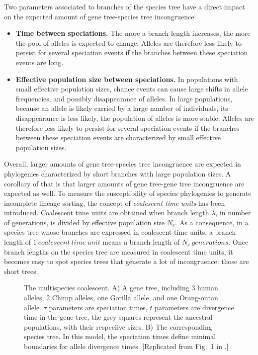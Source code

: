 Two parameters associated to branches of the species tree have a direct impact on the expected amount of gene tree-species tree incongruence:
\begin{itemize}
\item \textbf{Time between speciations.} The more a branch length increases, the more the pool of alleles is expected to change.
Alleles are therefore less likely to persist for several speciation events if the branches between these speciation events are long.
\item \textbf{Effective population size between speciations.} In populations with small effective population sizes, chance events can cause large shifts in allele frequencies, and possibly disappearance of alleles. 
In large populations, because an allele is likely carried by a large number of individuals, its disappearance is less likely, the population of alleles is more stable.
Alleles are therefore less likely to persist for several speciation events if the branches between these speciation events are characterized by small effective population sizes.
\end{itemize}
Overall, larger amounts of gene tree-species tree incongruence are expected in phylogenies characterized by short branches with large population sizes. 
A corollary of that is that larger amounts of gene tree-gene tree incongruence are expected as well. 
To measure the susceptibility of species phylogenies to generate incomplete lineage sorting, the concept of \emph{coalescent time units} has been introduced.
Coalescent time units are obtained when branch length $\lambda$, in number of generations, is divided by effective population size $N_e$.
As a consequence, in a species tree whose branches are expressed in coalescent time units, a branch length of $1~coalescent~time~unit $ means a branch length of $N_e~generations$. 
Once branch lengths on the species tree are measured in coalescent time units, it becomes easy to spot species trees that generate a lot of incongruence: those are short trees.

\begin{figure}[h!]
\centering
{}
\caption{\small The multispecies coalescent. A) A gene tree, including 3 human alleles, 2 Chimp alleles, one Gorilla allele, and one Orang-outan allele. $\tau$ parameters are speciation times, $t$ parameters are divergence time in the gene tree, the grey squares represent the ancestral populations, with their respeciive sizes.  B) The corresponding species tree. In this model, the speciation times define minimal boundaries for allele divergence times. [Replicated from Fig.~1 in \citet{Rannala2003}.]}
\label{fig2}
\end{figure}

